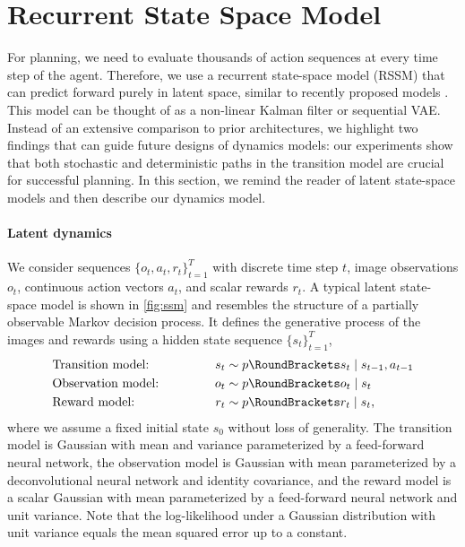 \section{Recurrent State Space Model}
\label{sec:model}



For planning, we need to evaluate thousands of action sequences at every time step of the agent. Therefore, we use a recurrent state-space model (RSSM) that can predict forward purely in latent space, similar to recently proposed models \citep{karl2016dvbf,buesing2018dssm,doerr2018prssm}. This model can be thought of as a non-linear Kalman filter or sequential VAE. Instead of an extensive comparison to prior architectures, we highlight two findings that can guide future designs of dynamics models: our experiments show that both stochastic and deterministic paths in the transition model are crucial for successful planning. In this section, we remind the reader of latent state-space models and then describe our dynamics model.

\paragraph{Latent dynamics}

We consider sequences $\{o_t,a_t,r_t\}_{t=1}^T$ with discrete time step $t$, image observations $o_t$, continuous action vectors $a_t$, and scalar rewards $r_t$. A typical latent state-space model is shown in \cref{fig:ssm} and resembles the structure of a partially observable Markov decision process. It defines the generative process of the images and rewards using a hidden state sequence $\{s_t\}_{t=1}^T$,
\begin{gather}
\begin{aligned}
\makebox[12em][l]{Transition model:} && s_t &\sim\p(s_t|s_{t-1},a_{t-1}) \\
\makebox[12em][l]{Observation model:} && o_t &\sim\p(o_t|s_t) \\
\makebox[12em][l]{Reward model:} && r_t &\sim\p(r_t|s_t),
\label{eq:ssm}
\end{aligned}
\raisetag{1.4\baselineskip}
\end{gather}%
where we assume a fixed initial state $s_0$ without loss of generality. The transition model is Gaussian with mean and variance parameterized by a feed-forward neural network, the observation model is Gaussian with mean parameterized by a deconvolutional neural network and identity covariance, and the reward model is a scalar Gaussian with mean parameterized by a feed-forward neural network and unit variance. Note that the log-likelihood under a Gaussian distribution with unit variance equals the mean squared error up to a constant.

